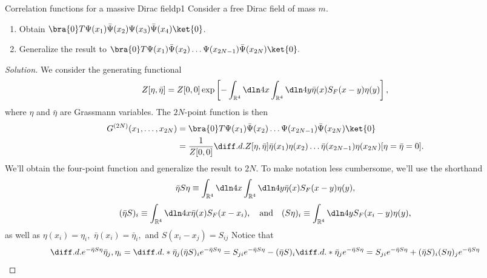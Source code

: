 \begin{problem}{Correlation functions for a massive Dirac field}{p1}
   Consider a free Dirac field of mass \(m\).
   \begin{enumerate}[label=(\alph*)]
      \item Obtain \(\bra{0}T \Psi(x_1) \bar{\Psi}(x_2) \Psi(x_3) \bar{\Psi}(x_4)\ket{0}\).
      \item Generalize the result to \(\bra{0} T \Psi(x_1) \bar{\Psi}(x_2) \dots \Psi(x_{2N - 1}) \bar{\Psi}(x_{2N})\ket{0}.\)
   \end{enumerate}
\end{problem}
\begin{proof}[Solution]
   We consider the generating functional
   \begin{equation*}
      Z[\eta, \bar{\eta}] = Z[0,0] \exp\left[- \int_{\mathbb{R}^4} \dln4x \int_{\mathbb{R}^4} \dln4y \bar{\eta}(x) S_F(x - y) \eta(y)\right],
   \end{equation*}
   where \(\eta\) and \(\bar{\eta}\) are Grassmann variables. The \(2N\)-point function is then
   \begin{align*}
      G^{(2N)}(x_1, \dots, x_{2N}) &= \bra{0} T \Psi(x_1) \bar{\Psi}(x_2) \dots \Psi(x_{2N - 1}) \bar{\Psi}(x_{2N})\ket{0}\\
                                   &= \frac{1}{Z[0,0]}\diff.d.{Z[\eta,\bar{\eta}]}{\bar{\eta}(x_{1})\eta(x_{2})\dots \bar{\eta}(x_{2N -1}) \eta(x_{2N})}[\eta = \bar{\eta} = 0].
   \end{align*}
   We'll obtain the four-point function and generalize the result to \(2N.\) To make notation less cumbersome, we'll use the shorthand 
   \begin{equation*}
      \bar{\eta} S \eta \equiv \int_{\mathbb{R}^4} \dln4x \int_{\mathbb{R}^4} \dln4{y} \bar{\eta}(x) S_F(x - y) \eta(y),
   \end{equation*}
   \begin{equation*}
      (\bar{\eta} S)_i \equiv \int_{\mathbb{R}^4} \dln4x \bar{\eta}(x) S_F(x - x_i),
      \quad\text{and}\quad
      (S \eta)_i \equiv \int_{\mathbb{R}^4} \dln4y S_F(x_i - y)\eta(y),
   \end{equation*}
   as well as \(\eta(x_i) = \eta_i,\) \(\bar{\eta}(x_i) = \bar{\eta}_i,\) and \(S(x_i - x_j) = S_{ij}\) Notice that
   \begin{align*}
      \diff.d.{e^{- \bar{\eta} S \eta}}{\bar{\eta}_j,\eta_i} &= \diff.d.*{}{\bar{\eta}_j} (\bar{\eta} S)_i e^{- \bar{\eta} S \eta} = S_{ji} e^{- \bar{\eta} S \eta} - (\bar{\eta} S)_i \diff.d.*{}{\bar{\eta}_j} e^{-\bar{\eta}S\eta} = S_{ji} e^{- \bar{\eta} S \eta} + (\bar{\eta} S)_i (S \eta)_j e^{- \bar{\eta} S \eta}\\

\end{align*}
\end{proof}

